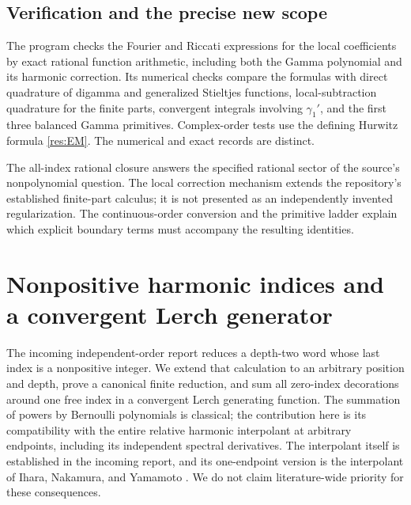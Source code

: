\documentclass[11pt,a4paper]{article}
\numberwithin{equation}{section}
\theoremstyle{definition}
\theoremstyle{remark}
\newcommand{\src}[1]{\texttt{\detokenize{#1}}}
\begin{document}
\subsection{Verification and the precise new scope}

The program \src{code/verify_resolvent.py} checks the Fourier and
Riccati expressions for the local coefficients by exact rational
function arithmetic, including both the Gamma polynomial and its
harmonic correction. Its numerical checks compare the formulas with
direct quadrature of digamma and generalized Stieltjes functions,
local-subtraction quadrature for the finite parts, convergent
integrals involving $\gamma_1'$, and the first three balanced
Gamma primitives. Complex-order tests use the defining Hurwitz
formula \eqref{res:EM}. The numerical and exact records are distinct.

The all-index rational closure answers the specified rational sector
of the source's nonpolynomial question. The local correction
mechanism extends the repository's established finite-part calculus;
it is not presented as an independently invented regularization.
The continuous-order conversion and the primitive ladder explain
which explicit boundary terms must accompany the resulting identities.




\section{Nonpositive harmonic indices and a convergent Lerch generator}
\label{harm:section}

The incoming independent-order report reduces a depth-two word whose
last index is a nonpositive integer. We extend that calculation to an
arbitrary position and depth, prove a canonical finite reduction, and
sum all zero-index decorations around one free index in a convergent
Lerch generating function. The summation of powers by Bernoulli
polynomials is classical; the contribution here is its compatibility
with the entire relative harmonic interpolant at arbitrary endpoints,
including its independent spectral derivatives. The interpolant itself
is established in the incoming report, and its one-endpoint version is
the interpolant of Ihara, Nakamura, and Yamamoto
\cite{harm:INY}. We do not claim literature-wide priority for these
consequences.
\end{document}
